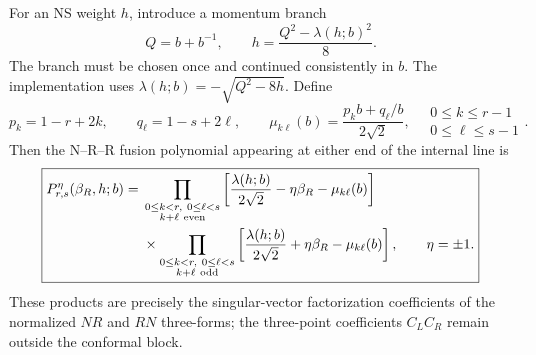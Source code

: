 \documentclass[11pt]{article}
\begin{document}
For an NS weight \(h\), introduce a momentum branch
\begin{equation}
 Q=b+b^{-1},
 \qquad
 h=\frac{Q^2-\lambda(h;b)^2}{8}.
 \label{eq:ns-lambda}
\end{equation}
The branch must be chosen once and continued consistently in \(b\).
The implementation uses
\(\lambda(h;b)=-\sqrt{Q^2-8h}\).  Define
\begin{equation}
 p_k=1-r+2k,\qquad q_\ell=1-s+2\ell,\qquad
 \mu_{k\ell}(b)=
 \frac{p_kb+q_\ell/b}{2\sqrt2},
 \quad
 \substack{0\le k\le r-1\\0\le\ell\le s-1}.
 \label{eq:fusion-index-set}
\end{equation}
Then the N--R--R fusion polynomial appearing at either end of the
internal line is
\begin{equation}
 \boxed{
 \begin{aligned}
 P^\eta_{r,s}(\beta_R,h;b)
 ={}&
 \prod_{\substack{0\le k<r,\ 0\le\ell<s\\k+\ell\ {\rm even}}}
 \left[
  \frac{\lambda(h;b)}{2\sqrt2}
  -\eta\beta_R-\mu_{k\ell}(b)
 \right]
 \\
 &\times
 \prod_{\substack{0\le k<r,\ 0\le\ell<s\\k+\ell\ {\rm odd}}}
 \left[
  \frac{\lambda(h;b)}{2\sqrt2}
  +\eta\beta_R-\mu_{k\ell}(b)
 \right],
 \qquad \eta=\pm1.
 \end{aligned}}
 \label{eq:ramond-fusion-polynomial}
\end{equation}
These products are precisely the singular-vector factorization
coefficients of the normalized \(NR\) and \(RN\) three-forms; the
three-point coefficients \(C_LC_R\) remain outside the conformal
block.
\end{document}
